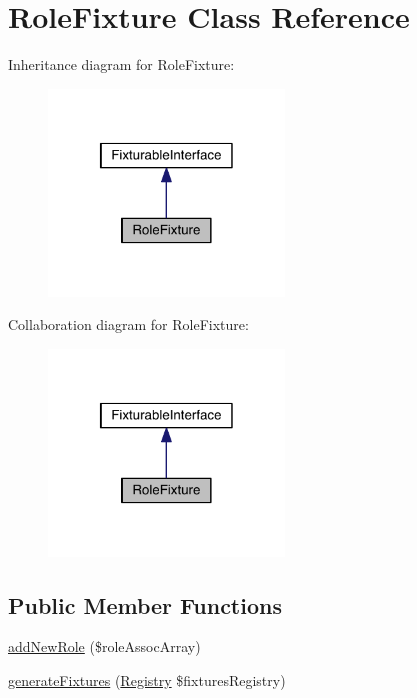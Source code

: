 \hypertarget{class_security_1_1_role_fixture}{\section{Role\-Fixture Class Reference}
\label{class_security_1_1_role_fixture}
}


Inheritance diagram for Role\-Fixture\-:
\nopagebreak
\begin{figure}[H]
\begin{center}
\leavevmode
\includegraphics[width=178pt]{class_security_1_1_role_fixture__inherit__graph}
\end{center}
\end{figure}


Collaboration diagram for Role\-Fixture\-:
\nopagebreak
\begin{figure}[H]
\begin{center}
\leavevmode
\includegraphics[width=178pt]{class_security_1_1_role_fixture__coll__graph}
\end{center}
\end{figure}
\subsection*{Public Member Functions}
\begin{DoxyCompactItemize}
\item 
\hyperlink{class_security_1_1_role_fixture_a379cfd33d87967732711b849cea34e3a}{add\-New\-Role} (\$role\-Assoc\-Array)
\item 
\hyperlink{class_security_1_1_role_fixture_a60af9abed72c391727622c642cc4c612}{generate\-Fixtures} (\hyperlink{classapp_1_1models_1_1core_1_1_registry}{Registry} \$fixtures\-Registry)
\end{DoxyCompactItemize}
